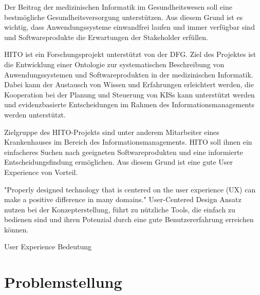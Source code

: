 
Der Beitrag der medizinischen Informatik im Gesundheitswesen soll eine bestmögliche Gesundheitsversorgung unterstützen.
Aus diesem Grund ist es wichtig, dass Anwendungssysteme einwandfrei laufen und immer verfügbar sind und Softwareprodukte die Erwartungen der Stakeholder erfüllen.

\ac{HITO} ist ein Forschungsprojekt unterstützt von der \ac{DFG}.
Ziel des Projektes ist die Entwicklung einer Ontologie zur systematischen Beschreibung von Anwendungssystemen und Softwareprodukten in der medizinischen Informatik.
Dabei kann der Austausch von Wissen und Erfahrungen erleichtert werden, die Kooperation bei der Planung und Steuerung von \acp{KIS} kann unterstützt werden und evidenzbasierte Entscheidungen im Rahmen des Informationsmanagements werden unterstützt.

Zielgruppe des HITO-Projekts sind unter anderem Mitarbeiter eines Krankenhauses im Bereich des Informationsmanagements. 
HITO soll ihnen ein einfacheres Suchen nach geeigneten Softwareprodukten und eine informierte Entscheidungsfindung ermöglichen. 
Aus diesem Grund ist eine gute User Experience von Vorteil. 

"Properly designed technology that is centered on the user experience (UX) can make a positive difference in many domains."
\newline  User-Centered Design Ansatz nutzen bei der Konzepterstellung, führt zu nützliche Tools, die einfach zu bedienen sind und ihren Potenzial durch eine gute Benutzererfahrung erreichen können.


User Experience Bedeutung 

\section{Problemstellung}\label{sec:problemstellung}

